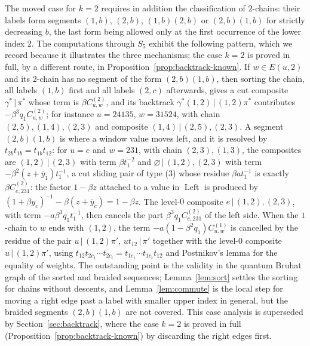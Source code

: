 \documentclass[11pt]{article}
\newcommand{\Left}{\operatorname{Left}}
\begin{document}
The moved case for $k=2$ requires in addition the classification of
$2$-chains: their labels form segments $(1,b)$, $(2,b)$, $(1,b)(2,b)$
or $(2,b)(1,b)$ for strictly decreasing $b$, the last form being
allowed only at the first occurrence of the lower index $2$. The
computations through $S_5$ exhibit the following pattern, which we
record because it illustrates the three mechanisms; the case $k=2$ is
proved in full, by a different route, in
Proposition~\ref{prop:backtrack-known}. If $w\in E(u,2)$ and its $2$-chain has
no segment of the form $(2,b)(1,b)$, then sorting the chain, all
labels $(1,b)$ first and all labels $(2,c)$ afterwards, gives a cut
composite $\gamma^\ast\,\big|\,\pi^\ast$ whose term is
$\beta C^{(2)}_{u,w}$, and its backtrack
$\gamma^\ast(1,2)\,\big|\,(1,2)\pi^\ast$ contributes
$-\beta^3q_1C^{(2)}_{u,w}$; for instance $u=24135$, $w=31524$, with
chain $(2,5),(1,4),(2,3)$ and composite $(1,4)\,\big|\,(2,5),(2,3)$.
A segment $(2,b)(1,b)$ is where a window value moves left, and it is
resolved by $t_{2b}t_{1b}=t_{1b}t_{12}$: for $u=e$ and $w=231$, with
chain $(2,3),(1,3)$, the composites are $(1,2)\,\big|\,(2,3)$ with term
$\beta t_1^{-2}$ and $\varnothing\,\big|\,(1,2),(2,3)$ with term
$-\beta^2(z+\overline y_1)t_1^{-1}$, a cut sliding pair of type (3)
whose residue $\beta a t_1^{-1}$ is exactly $\beta C^{(2)}_{e,231}$:
the factor $1-\beta z$ attached to a value in $\Left$ is produced by
$(1+\beta y_c)^{-1}-\beta(z+\overline y_c)=1-\beta z$. The level-$0$
composite $e\,\big|\,(1,2),(2,3)$, with term $-a\beta^3q_1t_1^{-1}$,
then cancels the part $\beta^3q_1C^{(2)}_{e,231}$ of the left side.
When the $1$-chain to $w$ ends with $(1,2)$, the term
$-a(1-\beta^2q_1)C^{(1)}_{u,w}$ is cancelled by the residue of the
pair $u\,\big|\,(1,2)\pi'$, $ut_{12}\,\big|\,\pi'$ together with the
level-$0$ composite $u\,\big|\,(1,2)\pi'$, using
$t_{12}t_{2c_1}\cdots t_{2c_t}=t_{1c_1}\cdots t_{1c_t}t_{12}$ and
Postnikov's lemma for the equality of weights. The outstanding point
is the validity in the quantum Bruhat graph of the sorted and braided
sequences; Lemma~\ref{lem:sort} settles the sorting for chains
without descents, and Lemma~\ref{lem:commute} is the local step for
moving a right edge past a label with smaller upper index in general,
but the braided segments $(2,b)(1,b)$ are not covered. This case
analysis is superseded by Section~\ref{sec:backtrack}, where the case
$k=2$ is proved in full (Proposition~\ref{prop:backtrack-known}) by
discarding the right edges first.
\end{document}
